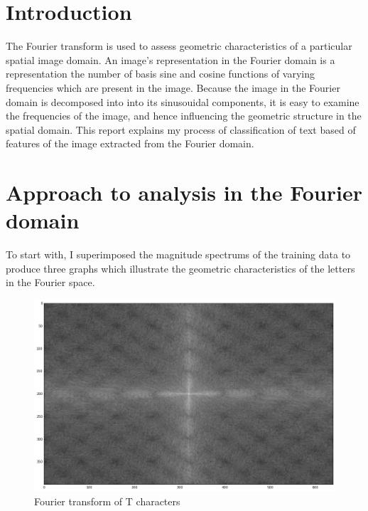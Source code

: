 \documentclass[a4paper,12px,twocolumn]{article}
\begin{document}
\begin{flushleft}
\section{Introduction}

The Fourier transform is used to assess geometric characteristics of a particular spatial
image domain. An image's representation in the Fourier domain is a representation the number
of basis sine and cosine functions of varying frequencies which are present in the image. Because
the image in the Fourier domain is decomposed into into its sinusouidal components, it is easy to
examine the frequencies of the image, and hence influencing the geometric structure in the spatial
domain. This report explains my process of classification of text based of features of the
image extracted from the Fourier domain.

\section{Approach to analysis in the Fourier domain}


To start with, I superimposed the magnitude spectrums of the training data to produce
three graphs which illustrate the geometric characteristics of the letters in the Fourier
space.

\begin{figure}[h!]
  \caption{Fourier transform of T characters}
  \includegraphics[scale=0.25]{fourierT}
\end{figure}


\end{flushleft}
\end{document}
